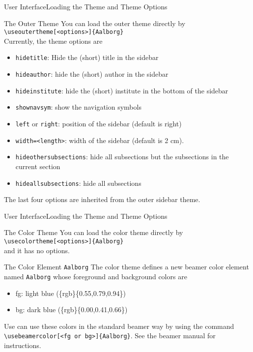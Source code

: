 \documentclass[10pt]{beamer}
\begin{document}
\begin{frame}{User Interface}{Loading the Theme and Theme Options}
  \begin{block}{The Outer Theme}
    You can load the outer theme directly by\\
    {\tt \textbackslash useoutertheme[<options>]\{Aalborg\}}\\
    Currently, the theme options are
  \begin{itemize}
    \item {\tt hidetitle}: Hide the (short) title in the sidebar
    \item {\tt hideauthor}: hide the (short) author in the sidebar
    \item {\tt hideinstitute}: hide the (short) institute in the bottom of the sidebar
    \item {\tt shownavsym}: show the navigation symbols
    \item {\tt left} or {\tt right}: position of the sidebar (default is right)
    \item {\tt width=<length>}: width of the sidebar (default is 2 cm).
    \item {\tt hideothersubsections}: hide all subsections but the subsections in the current section
    \item {\tt hideallsubsections}: hide all subsections
  \end{itemize}
  The last four options are inherited from the outer sidebar theme.
  \end{block}
\end{frame}

\begin{frame}{User Interface}{Loading the Theme and Theme Options}
  \begin{block}{The Color Theme}
    You can load the color theme directly by\\
    {\tt \textbackslash usecolortheme[<options>]\{Aalborg\}}\\
    and it has no options.
  \end{block}
  \pause
  \begin{block}{The Color Element {\tt Aalborg}}
    The color theme defines a new beamer color element named {\tt Aalborg} whose foreground and background colors are
    \begin{itemize}
      \item fg: {light blue (\{rgb\}\{0.55,0.79,0.94\})}
      \item bg: {dark blue (\{rgb\}\{0.00,0.41,0.66\})}
    \end{itemize}
    Use can use these colors in the standard beamer way by using the command
    {\tt \textbackslash usebeamercolor[<fg or bg>]\{Aalborg\}}. See the beamer manual for instructions.
  \end{block}
\end{frame}
\end{document}
